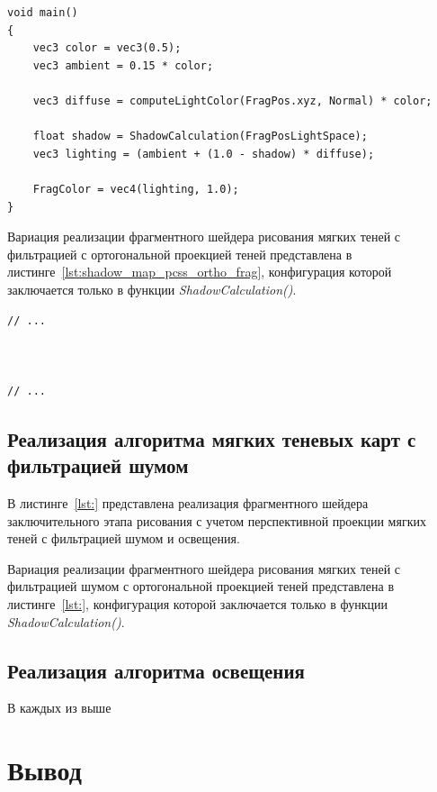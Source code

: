 \begin{center}
\begin{lstlisting}[label=lst:shadow_map_pcss_frag, caption=Фрагментный шейдер с учетом перспективного проецирония теней]
void main()
{
    vec3 color = vec3(0.5);
    vec3 ambient = 0.15 * color;

    vec3 diffuse = computeLightColor(FragPos.xyz, Normal) * color;

    float shadow = ShadowCalculation(FragPosLightSpace);                      
    vec3 lighting = (ambient + (1.0 - shadow) * diffuse);

    FragColor = vec4(lighting, 1.0);
}
\end{lstlisting}
\end{center}

Вариация реализации фрагментного шейдера рисования мягких теней с
фильтрацией с ортогональной проекцией теней представлена в
листинге~\ref{lst:shadow_map_pcss_ortho_frag}, конфигурация которой
заключается только в функции \textit{ShadowCalculation()}.

\begin{center}
\captionsetup{justification=centering, singlelinecheck=off}
\begin{lstlisting}[label=lst:shadow_map_pcss_ortho_frag, caption=Фрагментный шейдер с учетом ортогонального проецирония теней]
// ...



// ...
\end{lstlisting}
\end{center}
    

\subsection{Реализация алгоритма мягких теневых карт с фильтрацией шумом}

В листинге~\ref{lst:} представлена реализация фрагментного шейдера заключительного
этапа рисования с учетом перспективной проекции мягких теней с фильтрацией шумом и освещения.

Вариация реализации фрагментного шейдера рисования мягких теней с
фильтрацией шумом с ортогональной проекцией теней представлена в
листинге~\ref{lst:}, конфигурация которой
заключается только в функции \textit{ShadowCalculation()}.

\subsection{Реализация алгоритма освещения}

В каждых из выше

\section*{Вывод}